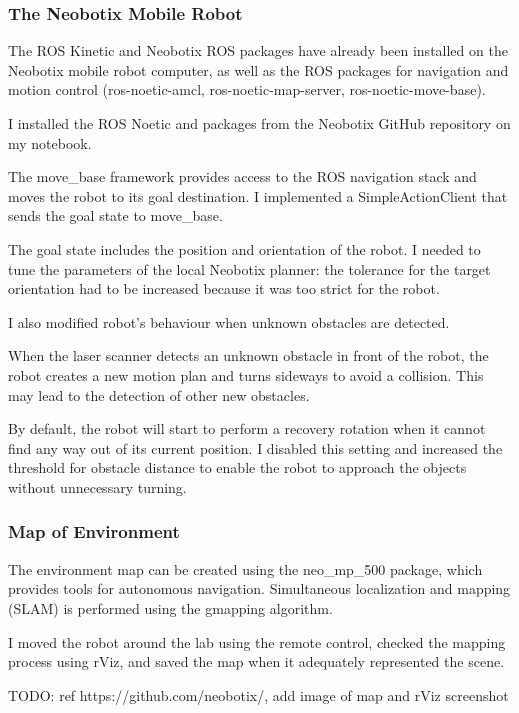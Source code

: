 \subsubsection{The Neobotix Mobile Robot}
The ROS Kinetic and Neobotix ROS packages have already been installed on the Neobotix mobile robot computer, as well as the ROS packages for navigation and motion control (ros-noetic-amcl, ros-noetic-map-server, ros-noetic-move-base).\par
I installed the ROS Noetic and packages from the Neobotix GitHub repository on my notebook. \par
The move\_base framework provides access to the ROS navigation stack and moves the robot to its goal destination. I implemented a SimpleActionClient that sends the goal state to move\_base.\par
The goal state includes the position and orientation of the robot. I needed to tune the parameters of the local Neobotix planner: the tolerance for the target orientation had to be increased because it was too strict for the robot.\par
I also modified robot's behaviour when unknown obstacles are detected. \par 
When the laser scanner detects an unknown obstacle in front of the robot, the robot creates a new motion plan and turns sideways to avoid a collision. This may lead to the detection of other new obstacles.\par
By default, the robot will start to perform a recovery rotation when it cannot find any way out of its current position. I disabled this setting and increased the threshold for obstacle distance to enable the robot to approach the objects without unnecessary turning.\par

\subsubsection{Map of Environment}
The environment map can be created using the neo\_mp\_500 package, which provides tools for autonomous navigation. Simultaneous localization and mapping (SLAM) is performed using the gmapping algorithm.\par
I moved the robot around the lab using the remote control, checked the mapping process using rViz, and saved the map when it adequately represented the scene.\par



TODO: 
ref https://github.com/neobotix/,
add image of map and rViz screenshot\par


